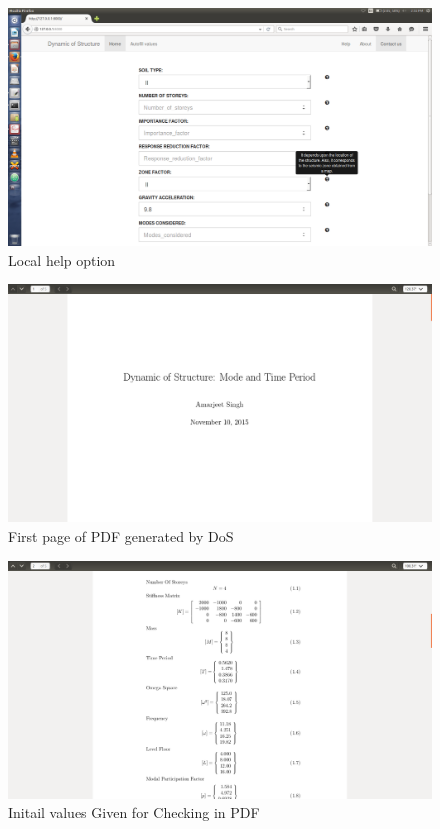 \begin{figure}[!h]
\centering \includegraphics[scale=0.31]{images/output/4.png}
\caption{Local help option}
\end{figure}
\newpage
\begin{figure}[!h]
\centering \includegraphics[scale=0.31]{images/output/6.png}
\caption{First page of PDF generated by DoS}
\end{figure}
\begin{figure}[!h]
\centering \includegraphics[scale=0.31]{images/output/7.png}
\caption{Initail values Given for Checking in PDF}
\end{figure}
